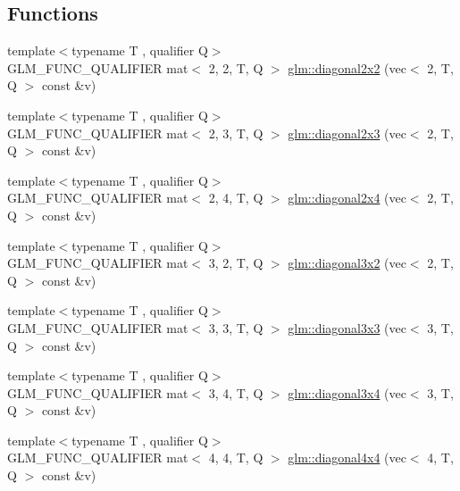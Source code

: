 \subsection*{Functions}
\begin{DoxyCompactItemize}
\item 
{\footnotesize template$<$typename T , qualifier Q$>$ }\\G\+L\+M\+\_\+\+F\+U\+N\+C\+\_\+\+Q\+U\+A\+L\+I\+F\+I\+ER mat$<$ 2, 2, T, Q $>$ \hyperlink{group__gtx__matrix__operation_ga58a32a2beeb2478dae2a721368cdd4ac}{glm\+::diagonal2x2} (vec$<$ 2, T, Q $>$ const \&v)
\item 
{\footnotesize template$<$typename T , qualifier Q$>$ }\\G\+L\+M\+\_\+\+F\+U\+N\+C\+\_\+\+Q\+U\+A\+L\+I\+F\+I\+ER mat$<$ 2, 3, T, Q $>$ \hyperlink{group__gtx__matrix__operation_gab69f900206a430e2875a5a073851e175}{glm\+::diagonal2x3} (vec$<$ 2, T, Q $>$ const \&v)
\item 
{\footnotesize template$<$typename T , qualifier Q$>$ }\\G\+L\+M\+\_\+\+F\+U\+N\+C\+\_\+\+Q\+U\+A\+L\+I\+F\+I\+ER mat$<$ 2, 4, T, Q $>$ \hyperlink{group__gtx__matrix__operation_ga30b4dbfed60a919d66acc8a63bcdc549}{glm\+::diagonal2x4} (vec$<$ 2, T, Q $>$ const \&v)
\item 
{\footnotesize template$<$typename T , qualifier Q$>$ }\\G\+L\+M\+\_\+\+F\+U\+N\+C\+\_\+\+Q\+U\+A\+L\+I\+F\+I\+ER mat$<$ 3, 2, T, Q $>$ \hyperlink{group__gtx__matrix__operation_ga832c805d5130d28ad76236958d15b47d}{glm\+::diagonal3x2} (vec$<$ 2, T, Q $>$ const \&v)
\item 
{\footnotesize template$<$typename T , qualifier Q$>$ }\\G\+L\+M\+\_\+\+F\+U\+N\+C\+\_\+\+Q\+U\+A\+L\+I\+F\+I\+ER mat$<$ 3, 3, T, Q $>$ \hyperlink{group__gtx__matrix__operation_ga5487ff9cdbc8e04d594adef1bcb16ee0}{glm\+::diagonal3x3} (vec$<$ 3, T, Q $>$ const \&v)
\item 
{\footnotesize template$<$typename T , qualifier Q$>$ }\\G\+L\+M\+\_\+\+F\+U\+N\+C\+\_\+\+Q\+U\+A\+L\+I\+F\+I\+ER mat$<$ 3, 4, T, Q $>$ \hyperlink{group__gtx__matrix__operation_gad7551139cff0c4208d27f0ad3437833e}{glm\+::diagonal3x4} (vec$<$ 3, T, Q $>$ const \&v)
\item 
{\footnotesize template$<$typename T , qualifier Q$>$ }\\G\+L\+M\+\_\+\+F\+U\+N\+C\+\_\+\+Q\+U\+A\+L\+I\+F\+I\+ER mat$<$ 4, 4, T, Q $>$ \hyperlink{group__gtx__matrix__operation_ga0b4cd8dea436791b072356231ee8578f}{glm\+::diagonal4x4} (vec$<$ 4, T, Q $>$ const \&v)

\end{DoxyCompactItemize}
